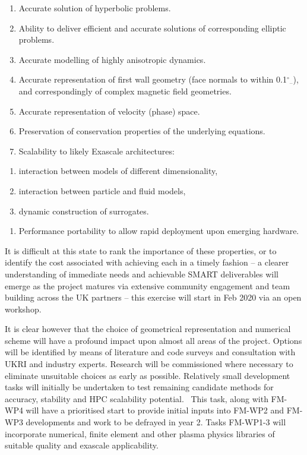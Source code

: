 \documentclass[a4paper]{article}
\newcommand\textsubscript[1]{\ensuremath{{}_{\text{#1}}}}
\newcommand\liststyleWWNumviii{%
\renewcommand\theenumi{\arabic{enumi}}
\renewcommand\theenumii{\arabic{enumii}}
\renewcommand\theenumiii{\arabic{enumiii}}
\renewcommand\theenumiv{\arabic{enumiv}}
\renewcommand\labelenumi{P\theenumi.}
\renewcommand\labelenumii{\theenumii.}
\renewcommand\labelenumiii{\theenumiii.}
\renewcommand\labelenumiv{\theenumiv.}
}
\newcommand\liststyleWWNumxiii{%
\renewcommand\theenumi{\alph{enumi}}
\renewcommand\theenumii{\alph{enumii}}
\renewcommand\theenumiii{\roman{enumiii}}
\renewcommand\theenumiv{\arabic{enumiv}}
\renewcommand\labelenumi{\theenumi.}
\renewcommand\labelenumii{\theenumii.}
\renewcommand\labelenumiii{\theenumiii.}
\renewcommand\labelenumiv{\theenumiv.}
}
\begin{document}
\liststyleWWNumviii
\begin{enumerate}
\item %
Accurate solution of hyperbolic problems.
\item Ability to deliver efficient and accurate solutions of corresponding elliptic problems.
\item Accurate modelling of highly anisotropic dynamics. 
\item Accurate representation of first wall geometry (face normals to within 0.1$^\circ$\textsubscript{--}), and
correspondingly of complex magnetic field geometries.
\item Accurate representation of velocity (phase) space.
\item Preservation of conservation properties of the underlying equations.
\item Scalability to likely Exascale architectures:
\end{enumerate}
\liststyleWWNumxiii
\begin{enumerate}
\item interaction between models of different dimensionality,
\item interaction between particle and fluid models,
\item dynamic construction of surrogates.
\end{enumerate}
\liststyleWWNumviii
\begin{enumerate}
\item Performance portability to allow rapid deployment upon emerging hardware.
\end{enumerate}

\bigskip

It is difficult at this state to rank the importance of these properties, or to identify the cost associated with
achieving each in a timely fashion -- a clearer understanding of immediate needs and achievable SMART deliverables will
emerge as the project matures via extensive community engagement and team building across the UK partners -- this
exercise will start in Feb 2020 via an open workshop. 


\bigskip

It is clear however that the choice of geometrical representation and numerical scheme will have a profound impact upon
almost all areas of the project. Options will be identified by means of literature and code surveys and consultation
with UKRI and industry experts. Research will be commissioned where necessary to eliminate unsuitable choices as early
as possible. Relatively small development tasks will initially be undertaken to test remaining candidate methods for
accuracy, stability and HPC scalability potential. \ This task, along with FM-WP4 will have a prioritised start to
provide initial inputs into FM-WP2 and FM-WP3 developments and work to be defrayed in year 2. Tasks FM-WP1-3 will
incorporate numerical, finite element and other plasma physics libraries of suitable quality and exascale
applicability.
\end{document}
